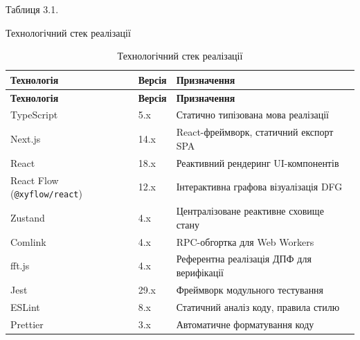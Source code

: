 Таблиця 3.1.

Технологічний стек реалізації

\begin{longtable}[]{@{}
  >{\raggedright\arraybackslash}p{}
  >{\raggedright\arraybackslash}p{}
  >{\raggedright\arraybackslash}p{}@{}}
\caption[Технологічний стек реалізації]{Технологічний стек
реалізації}\tabularnewline
\toprule\noalign{}
\begin{minipage}[b]{\linewidth}\raggedright
\textbf{Технологія}
\end{minipage} & \begin{minipage}[b]{\linewidth}\raggedright
\textbf{Версія}
\end{minipage} & \begin{minipage}[b]{\linewidth}\raggedright
\textbf{Призначення}
\end{minipage} \\
\midrule\noalign{}
\endfirsthead
\toprule\noalign{}
\begin{minipage}[b]{\linewidth}\raggedright
\textbf{Технологія}
\end{minipage} & \begin{minipage}[b]{\linewidth}\raggedright
\textbf{Версія}
\end{minipage} & \begin{minipage}[b]{\linewidth}\raggedright
\textbf{Призначення}
\end{minipage} \\
\midrule\noalign{}
\endhead
\bottomrule\noalign{}
\endlastfoot
TypeScript & 5.x & Статично типізована мова реалізації \\
Next.js & 14.x & React-фреймворк, статичний експорт SPA \\
React & 18.x & Реактивний рендеринг UI-компонентів \\
React Flow (\texttt{@xyflow/react}) & 12.x & Інтерактивна графова
візуалізація DFG \\
Zustand & 4.x & Централізоване реактивне сховище стану \\
Comlink & 4.x & RPC-обгортка для Web Workers \\
fft.js & 4.x & Референтна реалізація ДПФ для верифікації \\
Jest & 29.x & Фреймворк модульного тестування \\
ESLint & 8.x & Статичний аналіз коду, правила стилю \\
Prettier & 3.x & Автоматичне форматування коду \\
\end{longtable}

